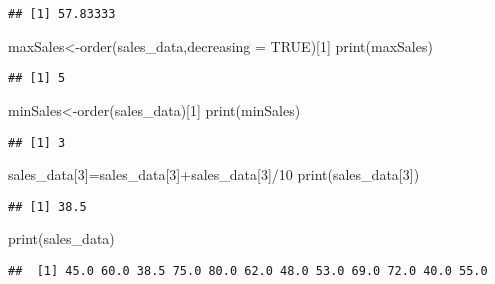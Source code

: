 \documentclass[
]{article}
\newenvironment{Shaded}{\begin{snugshade}}{\end{snugshade}}
\newcommand{\AttributeTok}[1]{\textcolor[rgb]{0.77,0.63,0.00}{#1}}
\newcommand{\ConstantTok}[1]{\textcolor[rgb]{0.00,0.00,0.00}{#1}}
\newcommand{\DecValTok}[1]{\textcolor[rgb]{0.00,0.00,0.81}{#1}}
\newcommand{\FunctionTok}[1]{\textcolor[rgb]{0.00,0.00,0.00}{#1}}
\newcommand{\NormalTok}[1]{#1}
\newcommand{\OtherTok}[1]{\textcolor[rgb]{0.56,0.35,0.01}{#1}}
\newcommand{\SpecialCharTok}[1]{\textcolor[rgb]{0.00,0.00,0.00}{#1}}
\begin{document}
\begin{verbatim}
## [1] 57.83333
\end{verbatim}

\begin{Shaded}
\begin{Highlighting}[]
\NormalTok{maxSales}\OtherTok{\textless{}{-}}\FunctionTok{order}\NormalTok{(sales\_data,}\AttributeTok{decreasing =} \ConstantTok{TRUE}\NormalTok{)[}\DecValTok{1}\NormalTok{]}
\FunctionTok{print}\NormalTok{(maxSales)}
\end{Highlighting}
\end{Shaded}

\begin{verbatim}
## [1] 5
\end{verbatim}

\begin{Shaded}
\begin{Highlighting}[]
\NormalTok{minSales}\OtherTok{\textless{}{-}}\FunctionTok{order}\NormalTok{(sales\_data)[}\DecValTok{1}\NormalTok{]}
\FunctionTok{print}\NormalTok{(minSales)}
\end{Highlighting}
\end{Shaded}

\begin{verbatim}
## [1] 3
\end{verbatim}

\begin{Shaded}
\begin{Highlighting}[]
\NormalTok{sales\_data[}\DecValTok{3}\NormalTok{]}\OtherTok{=}\NormalTok{sales\_data[}\DecValTok{3}\NormalTok{]}\SpecialCharTok{+}\NormalTok{sales\_data[}\DecValTok{3}\NormalTok{]}\SpecialCharTok{/}\DecValTok{10}
\FunctionTok{print}\NormalTok{(sales\_data[}\DecValTok{3}\NormalTok{])}
\end{Highlighting}
\end{Shaded}

\begin{verbatim}
## [1] 38.5
\end{verbatim}

\begin{Shaded}
\begin{Highlighting}[]
\FunctionTok{print}\NormalTok{(sales\_data)}
\end{Highlighting}
\end{Shaded}

\begin{verbatim}
##  [1] 45.0 60.0 38.5 75.0 80.0 62.0 48.0 53.0 69.0 72.0 40.0 55.0
\end{verbatim}
\end{document}
